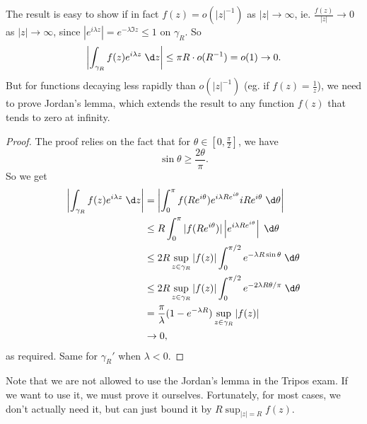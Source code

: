 \documentclass[a4paper]{article}
\begin{document}
The result is easy to show if in fact $f(z) = o(|z|^{-1})$ as $|z| \to \infty$, ie. $\frac{f(z)}{|z|} \to 0$ as $|z|\to \infty$, since $|e^{i\lambda z}| = e^{-\lambda \Im z} \leq 1$ on $\gamma_R$. So
\[
  \left|\int_{\gamma_R} f(z) e^{i \lambda z}\;\d z\right| \leq \pi R \cdot o(R^{-1}) = o(1) \to 0.
\]
But for functions decaying less rapidly than $o(|z|^{-1})$ (eg. if $f(z) = \frac{1}{z}$), we need to prove Jordan's lemma, which extends the result to any function $f(z)$ that tends to zero at infinity.
\begin{proof}
  The proof relies on the fact that for $\theta \in \left[0, \frac{\pi}{2}\right]$, we have
  \[
    \sin \theta \geq \frac{2\theta}{\pi}.
  \]
  So we get
  \begin{align*}
    \left|\int_{\gamma_R} f(z) e^{i\lambda z}\;\d z\right| &= \left|\int_0^\pi f(Re^{i\theta}) e^{i\lambda Re^{i\theta}} i R e^{i\theta}\;\d \theta\right|\\
    &\leq R\int_0^\pi |f(Re^{i\theta})| \left|e^{i\lambda R e^{i\theta}}\right|\;\d \theta\\
    &\leq 2R\sup_{z \in \gamma_R} |f(z)| \int_0^{\pi/2} e^{-\lambda R \sin \theta}\;\d \theta\\
    &\leq 2R\sup_{z \in \gamma_R} |f(z)| \int_0^{\pi/2} e^{-2\lambda R \theta/\pi}\;\d \theta\\
    &= \frac{\pi}{\lambda}(1 - e^{-\lambda R}) \sup_{z \in \gamma_R}|f(z)|\\
    &\to 0,
  \end{align*}
  as required. Same for $\gamma_R'$ when $\lambda < 0$.
\end{proof}
Note that we are not allowed to use the Jordan's lemma in the Tripos exam. If we want to use it, we must prove it ourselves. Fortunately, for most cases, we don't actually need it, but can just bound it by $R \sup_{|z| = R} f(z)$.
\end{document}
